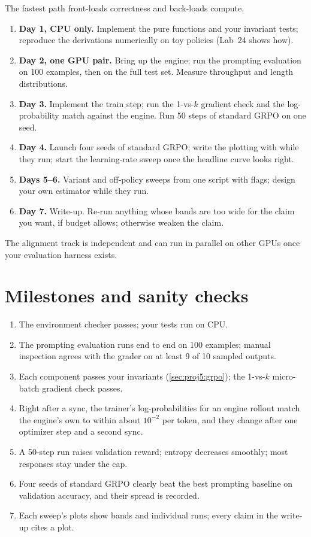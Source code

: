 The fastest path front-loads correctness and back-loads compute.
\begin{enumerate}
\item \textbf{Day 1, CPU only.} Implement the pure functions and your invariant tests; reproduce the
  derivations numerically on toy policies (Lab~24 shows how).
\item \textbf{Day 2, one GPU pair.} Bring up the engine; run the prompting evaluation on 100 examples,
  then on the full test set. Measure throughput and length distributions.
\item \textbf{Day 3.} Implement the train step; run the 1-vs-$k$ gradient check and the log-probability
  match against the engine. Run 50 steps of standard GRPO on one seed.
\item \textbf{Day 4.} Launch four seeds of standard GRPO; write the plotting with 
  while they run; start the learning-rate sweep once the headline curve looks right.
\item \textbf{Days 5--6.} Variant and off-policy sweeps from one script with flags; design your own
  estimator while they run.
\item \textbf{Day 7.} Write-up. Re-run anything whose bands are too wide for the claim you want, if
  budget allows; otherwise weaken the claim.
\end{enumerate}
The alignment track is independent and can run in parallel on other GPUs once your evaluation
harness exists.

\section{Milestones and sanity checks}\label{sec:proj5:milestones}
\begin{enumerate}
\item The environment checker passes; your tests run on CPU.
\item The prompting evaluation runs end to end on 100 examples; manual inspection agrees with the
  grader on at least 9 of 10 sampled outputs.
\item Each component passes your invariants (\cref{sec:proj5:grpo}); the 1-vs-$k$ micro-batch gradient
  check passes.
\item Right after a sync, the trainer's log-probabilities for an engine rollout match the engine's own to
  within about $10^{-2}$ per token, and they change after one optimizer step and a second sync.
\item A 50-step run raises validation reward; entropy decreases smoothly; most responses stay under the
  cap.
\item Four seeds of standard GRPO clearly beat the best prompting baseline on validation accuracy, and
  their spread is recorded.
\item Each sweep's plots show bands and individual runs; every claim in the write-up cites a plot.
\end{enumerate}

